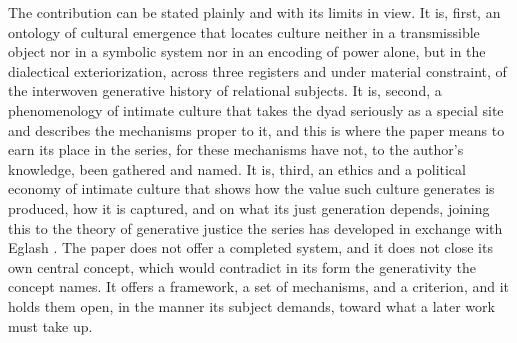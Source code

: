 The contribution can be stated plainly and with its limits in view. It is, first, an ontology of cultural emergence that locates culture neither in a transmissible object nor in a symbolic system nor in an encoding of power alone, but in the dialectical exteriorization, across three registers and under material constraint, of the interwoven generative history of relational subjects. It is, second, a phenomenology of intimate culture that takes the dyad seriously as a special site and describes the mechanisms proper to it, and this is where the paper means to earn its place in the series, for these mechanisms have not, to the author's knowledge, been gathered and named. It is, third, an ethics and a political economy of intimate culture that shows how the value such culture generates is produced, how it is captured, and on what its just generation depends, joining this to the theory of generative justice the series has developed in exchange with Eglash \parencite{eglash2016}. The paper does not offer a completed system, and it does not close its own central concept, which would contradict in its form the generativity the concept names. It offers a framework, a set of mechanisms, and a criterion, and it holds them open, in the manner its subject demands, toward what a later work must take up.
